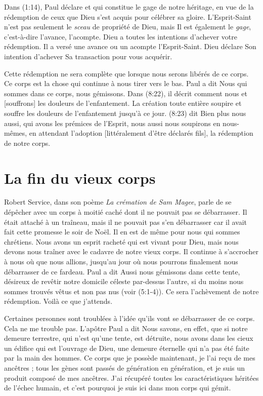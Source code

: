 Dans (1:14), Paul déclare\frcolon{}
 \Og [\dots{}] et qui constitue le gage de notre héritage,
 en vue de la rédemption de ceux que Dieu s'est acquis
 pour célébrer sa gloire. \Fg{}
 L'Esprit-Saint n'est pas seulement le \emph{sceau} de propriété de Dieu,
 mais Il est également le \emph{gage}, c'est-à-dire l'avance, l'acompte.
 Dieu a toutes les intentions d'achever votre rédemption.
 Il a versé une avance ou un acompte\frcolon{} l'Esprit-Saint.
 Dieu déclare Son intention d'achever Sa transaction pour vous acquérir.

Cette rédemption ne sera complète que lorsque nous serons libérés
 de ce corps.
 Ce corps est la chose qui continue à nous tirer vers le bas.
 Paul a dit\frcolon{}
 \Og Nous qui sommes dans ce corps, nous gémissons. \Fg{}
 Dans (8:22), il décrit comment nous
 \Og [soupirons] et [souffrons] les douleurs de l'enfantement. \Fg{}
 La création toute entière soupire et souffre
 les douleurs de l'enfantement jusqu'à ce jour.
 (8:23) dit\frcolon{}
 \Og Bien plus\frcolon{} nous aussi, qui avons les prémices de l'Esprit,
 nous aussi nous soupirons en nous-mêmes, en attendant l'adoption
 [littéralement\frcolon{} d'être déclarés fils],
 la rédemption de notre corps. \Fg{}


\section{La fin du vieux corps}

Robert Service, dans son poème \emph{La crémation de Sam Magee},
 parle de se dépêcher \Og avec un corps à moitié caché
 dont il ne pouvait pas se débarrasser. \Fg{}
 Il était attaché à un traîneau, mais il ne pouvait pas s'en débarrasser
 car il avait fait cette promesse le soir de Noël.
 Il en est de même pour nous qui sommes chrétiens.
 Nous avons un esprit racheté qui est vivant pour Dieu,
 mais nous devons nous traîner avec le cadavre de notre vieux corps.
 Il continue à s'accrocher à nous où que nous allions, jusqu'au jour où nous pourrons
 finalement nous débarrasser de ce fardeau. Paul a dit\frcolon{}
 \Og Aussi nous gémissons dans cette tente, désireux de revêtir
 notre domicile céleste par-dessus l'autre, si du moins nous sommes
 trouvés vêtus et non pas nus \Fg{} (voir (5:1-4)).
 Ce sera l'achèvement de notre rédemption. Voilà ce que j'attends.

Certaines personnes sont troublées
 à l'idée qu'ils vont se débarrasser de ce corps. Cela ne me trouble pas.
 L'apôtre Paul a dit\frcolon{}
 \Og  Nous savons, en effet, que si notre demeure terrestre,
 qui n'est qu'une tente, est détruite, nous avons dans les cieux
 un édifice qui est l'ouvrage de Dieu, une demeure éternelle
 qui n'a pas été faite par la main des hommes. \Fg{}
 Ce corps que je possède maintenant, je l'ai reçu de mes ancêtres ;
 tous les gènes sont passés de génération en génération,
 et je suis un produit composé de mes ancêtres.
 J'ai récupéré toutes les caractéristiques héritées de l'échec humain,
 et c'est pourquoi je suis ici dans mon corps qui gémit.


